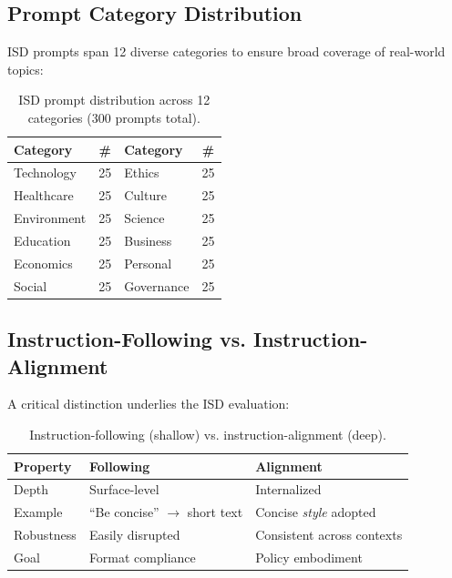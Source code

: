 \vspace{-2mm}
\subsection{Prompt Category Distribution}
\label{sec:prompt_categories}

ISD prompts span 12 diverse categories to ensure broad coverage of real-world topics:

\begin{table}[H]
\centering
\small
\begin{tabular}{@{}lc|lc@{}}
\toprule
\textbf{Category} & \textbf{\#} & \textbf{Category} & \textbf{\#} \\
\midrule
Technology & 25 & Ethics & 25 \\
\hline
Healthcare & 25 & Culture & 25 \\
\hline
Environment & 25 & Science & 25 \\
\hline
Education & 25 & Business & 25 \\
\hline
Economics & 25 & Personal & 25 \\
\hline
Social & 25 & Governance & 25 \\
\bottomrule
\end{tabular}
\caption{ISD prompt distribution across 12 categories (300 prompts total).}
\label{tab:prompt_categories}
\vspace{-4mm}
\end{table}

\vspace{-2mm}
\subsection{Instruction-Following vs. Instruction-Alignment}
\label{sec:following_vs_alignment}

A critical distinction underlies the ISD evaluation:

\begin{table}[H]
\centering
\small
\begin{tabularx}{\columnwidth}{@{}lXX@{}}
\toprule
\textbf{Property} & \textbf{Following} & \textbf{Alignment} \\
\midrule
Depth & Surface-level & Internalized \\
\hline
Example & ``Be concise'' $\rightarrow$ short text & Concise \textit{style} adopted \\
\hline
Robustness & Easily disrupted & Consistent across contexts \\
\hline
Goal & Format compliance & Policy embodiment \\
\bottomrule
\end{tabularx}
\caption{Instruction-following (shallow) vs. instruction-alignment (deep).}
\label{tab:following_vs_alignment}
\vspace{-4mm}
\end{table}

